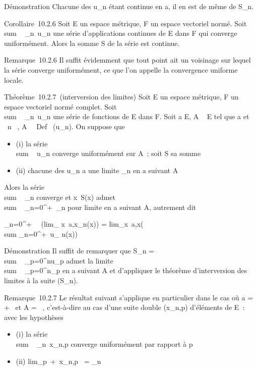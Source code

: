 \documentclass[]{article}
\begin{document}
Démonstration Chacune des u_n étant continue en a, il en est de
même de S_n.

Corollaire~10.2.6 Soit E un espace métrique, F un espace vectoriel
normé. Soit \\sum ~
_n\in{}~u_n une série d'applications continues de E dans F
qui converge uniformément. Alors la somme S de la série est continue.

Remarque~10.2.6 Il suffit évidemment que tout point ait un voisinage sur
lequel la série converge uniformément, ce que l'on appelle la
convergence uniforme locale.

Théorème~10.2.7~(interversion des limites) Soit E un espace métrique, F
un espace vectoriel normé complet. Soit
\\sum ~
_n\in{}~u_n une série de fonctions de E dans F. Soit a \in E,
A \subset~ E tel que a \in\overlineA et
\forall~n \in {}~, A \subset~\ Def~
(u_n). On suppose que

\begin{itemize}
\itemsep1pt\parskip0pt
\item
  (i) la série \\sum ~
  u_n converge uniformément sur A~; soit S sa somme
\item
  (ii) chacune des u_n a une limite \ell_n en a suivant A
\end{itemize}

Alors la série \\sum ~
\ell_n converge et x\mapsto~S(x) admet
\\sum ~
_n=0^+\infty~\ell_n pour limite en a suivant A, autrement
dit

\sum _n=0^+\infty~~\left
(lim_ x\rightarrow~a,x\inAu_n(x)\right ) =
lim_x\rightarrow~a,x\inA\left (\\sum
_n=0^+\infty~u_ n(x)\right )

Démonstration Il suffit de remarquer que S_n
= \\sum ~
_p=0^nu_p admet la limite
\\sum ~
_p=0^n\ell_p en a suivant A et d'appliquer le
théorème d'interversion des limites à la suite (S_n).

Remarque~10.2.7 Le résultat suivant s'applique en particulier dans le
cas où a = +\infty~ et A = ~, c'est-à-dire au cas d'une suite double
(x_n,p) d'éléments de E~: avec les hypothèses

\begin{itemize}
\itemsep1pt\parskip0pt
\item
  (i) la série \\sum ~
  _n\in{}~x_n,p converge uniformément par rapport à p
\item
  (ii) lim_p\rightarrow~+\infty~x_n,p~ =
  \ell_n
\end{itemize}
\end{document}

